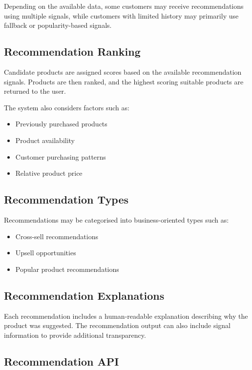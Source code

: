 \documentclass[12pt,a4paper]{report}
\begin{document}
Depending on the available data, some customers may receive
recommendations using multiple signals, while customers with limited
history may primarily use fallback or popularity-based signals.

\subsection{Recommendation Ranking}

Candidate products are assigned scores based on the available
recommendation signals. Products are then ranked, and the highest
scoring suitable products are returned to the user.

The system also considers factors such as:

\begin{itemize}
    \item Previously purchased products
    \item Product availability
    \item Customer purchasing patterns
    \item Relative product price
\end{itemize}

\subsection{Recommendation Types}

Recommendations may be categorised into business-oriented types such
as:

\begin{itemize}
    \item Cross-sell recommendations
    \item Upsell opportunities
    \item Popular product recommendations
\end{itemize}

\subsection{Recommendation Explanations}

Each recommendation includes a human-readable explanation describing
why the product was suggested. The recommendation output can also
include signal information to provide additional transparency.

\subsection{Recommendation API}
\end{document}
